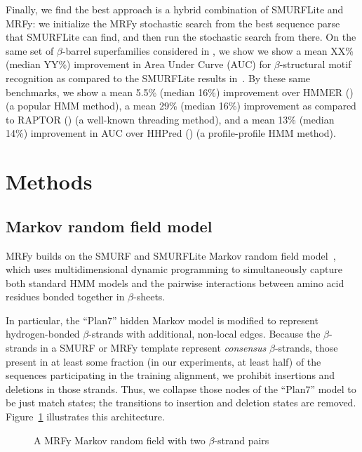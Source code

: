 \documentclass{acm_proc_article-sp}
\begin{document}
Finally, we find the best approach is a hybrid combination of
SMURFLite and MRFy: we initialize the MRFy stochastic search from the
best sequence parse that SMURFLite can find, and then run the
stochastic search from there. On the same set of $\beta$-barrel superfamilies 
considered in \cite{Daniels:2012dg}, we show 
we  show a mean XX\% (median YY\%) improvement in Area Under 
Curve (AUC) for
$\beta$-structural motif recognition as compared to the SMURFLite results 
in~\cite{Daniels:2012dg}.
By these same benchmarks, we show a mean 5.5\% (median 16\%) improvement over
HMMER (\cite{Eddy:1998ut}) (a popular HMM method), a mean 29\% (median
16\%) improvement as compared to RAPTOR (\cite{Xu:2003p3417}) (a
well-known threading method), and a mean 13\% (median 14\%) improvement in AUC 
over HHPred (\cite{Soding:2005ff}) (a profile-profile HMM method).



\section{Methods}

\subsection{Markov random field model}

MRFy builds on the SMURF and SMURFLite Markov random field 
model~\cite{Daniels:2012dg}, which uses multidimensional 
dynamic programming to simultaneously capture both standard HMM models and the
pairwise interactions between amino acid residues bonded together in
$\beta$-sheets. 

In particular, the ``Plan7'' hidden Markov model is modified to represent
hydrogen-bonded $\beta$-strands with additional, non-local edges.
Because the $\beta$-strands in a SMURF or MRFy template represent 
\emph{consensus} 
$\beta$-strands, those present in at least some fraction (in our experiments, 
at least
half) of the sequences participating in the training alignment, we prohibit
insertions and deletions in those strands.
Thus, we collapse those nodes of the ``Plan7'' model to be just match states;
the transitions to insertion and deletion states are removed.
Figure~\ref{mrfy_model} illustrates this architecture.


\begin{figure}[htb!]
\begin{center}
   \caption{A MRFy Markov random field with two $\beta$-strand pairs}
   \label{mrfy_model}
 \end{center}
\end{figure}
\end{document}

